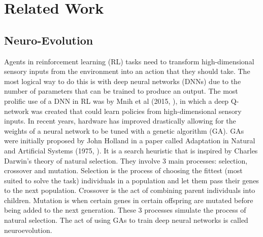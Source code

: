 \chapter{Related Work}

\label{ch:background}

\section{Neuro-Evolution}
Agents in reinforcement learning (RL) tasks need to transform high-dimensional sensory inputs from the environment into an action that they should take. The most logical way to do this is with deep neural networks (DNNs) due to the number of parameters that can be trained to produce an output. The most prolific use of a DNN in RL was by Mnih et al (2015, \cite{mnih}), in which a deep Q-network was created that could learn policies from high-dimensional sensory inputs. In recent years, hardware has improved drastically allowing for the weights of a neural network to be tuned with a genetic algorithm (GA). GAs were initially proposed by John Holland in a paper called Adaptation in Natural and Artificial Systems (1975, \cite{holland}). It is a search heuristic that is inspired by Charles Darwin's theory of natural selection. They involve 3 main processes: selection, crossover and mutation. Selection is the process of choosing the fittest (most suited to solve the task) individuals in a population and let them pass their genes to the next population. Crossover is the act of combining parent individuals into children. Mutation is when certain genes in certain offspring are mutated before being added to the next generation. These 3 processes simulate the process of natural selection. The act of using GAs to train deep neural networks is called neuroevolution.

\paragraph{}

